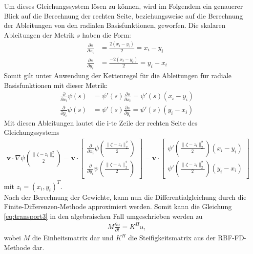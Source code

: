 \documentclass[12pt,titlepage]{article}
\begin{document}
Um dieses Gleichungssystem lösen zu können, wird im Folgendem ein genauerer Blick auf die Berechnung der rechten Seite, beziehungsweise auf die Berechnung der Ableitungen von den radialen Basisfunktionen, geworfen. 
Die skalaren Ableitungen der Metrik $s$ haben die Form:
\begin{align}
 \frac{\partial s}{\partial x_i}&=\frac{2(x_i-y_i)}{2}=x_i-y_i\\
 \frac{\partial s}{\partial y_i}&=\frac{-2(x_i-y_i)}{2}=y_i-x_i
\end{align}
Somit gilt unter Anwendung der Kettenregel für die Ableitungen für radiale Basisfunktionen mit dieser Metrik:
\begin{align}
  \frac{\partial}{\partial x_i}\psi(s)&= \psi'(s)\frac{\partial s}{\partial x_i}=\psi'(s)(x_i-y_i)\\
 \frac{\partial}{\partial y_i}\psi(s)&= \psi'(s)\frac{\partial s}{\partial y_i}=\psi'(s)(y_i-x_i)
\end{align}
Mit diesen Ableitungen lautet die i-te Zeile der rechten Seite des Gleichungssystems
\begin{align}
\textbf{v}\cdot\nabla\psi\left(\frac{\|\zeta-z_i\|_2^2}{2}\right)
 =
\textbf{v}\cdot
\begin{bmatrix}
\frac{\partial}{\partial x_i}\psi\left(\frac{\|\zeta-z_i\|_2^2}{2}\right)\\
\frac{\partial}{\partial y_i}\psi\left(\frac{\|\zeta-z_i\|_2^2}{2}\right) 
\end{bmatrix}
=
\textbf{v}\cdot
\begin{bmatrix}
\psi'\left(\frac{\|\zeta-z_i\|_2^2}{2}\right)(x_i-y_i) \\
\psi'\left(\frac{\|\zeta-z_i\|_2^2}{2}\right)(y_i-x_i)
\end{bmatrix}\nonumber
\end{align}
mit $z_i=(x_i,y_i)^T$.\\
Nach der Berechnung der Gewichte, kann nun die Differentialgleichung durch die Finite-Differenzen-Methode approximiert werden. Somit kann die Gleichung \eqref{eq:transport3} in den algebraischen Fall umgeschrieben werden zu
\begin{align}
 M\frac{\partial u}{\partial t}=K^Hu\label{eq:algTrans},
\end{align}
wobei $M$ die Einheitsmatrix dar und $K^H$ die Steifigkeitsmatrix aus der RBF-FD-Methode dar.
\pagebreak
\end{document}
